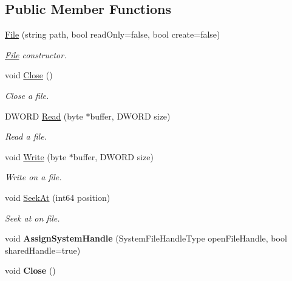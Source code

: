\subsection*{Public Member Functions}
\begin{DoxyCompactItemize}
\item 
\hyperlink{class_gost_crypt_1_1_file_abc79497e09b0c9600a229e1eb5edecad}{File} (string path, bool read\+Only=false, bool create=false)
\begin{DoxyCompactList}\small\item\em \hyperlink{class_gost_crypt_1_1_file}{File} constructor. \end{DoxyCompactList}\item 
void \hyperlink{class_gost_crypt_1_1_file_aec5740eb69e5ec15d77818aadeaf5001}{Close} ()
\begin{DoxyCompactList}\small\item\em Close a file. \end{DoxyCompactList}\item 
D\+W\+O\+RD \hyperlink{class_gost_crypt_1_1_file_a633fa1572500c241ddb5b9272bb70600}{Read} (byte $\ast$buffer, D\+W\+O\+RD size)
\begin{DoxyCompactList}\small\item\em Read a file. \end{DoxyCompactList}\item 
void \hyperlink{class_gost_crypt_1_1_file_a994d0e6bff285330edea0f5daaa17da1}{Write} (byte $\ast$buffer, D\+W\+O\+RD size)
\begin{DoxyCompactList}\small\item\em Write on a file. \end{DoxyCompactList}\item 
void \hyperlink{class_gost_crypt_1_1_file_abfbb1c586ef29c31a905d1478d323bdd}{Seek\+At} (int64 position)
\begin{DoxyCompactList}\small\item\em Seek at on file. \end{DoxyCompactList}\item 
\mbox{\label{class_gost_crypt_1_1_file_ad701bd2ec025e674f2032dc6b2391fe8}} 
void {\bfseries Assign\+System\+Handle} (System\+File\+Handle\+Type open\+File\+Handle, bool shared\+Handle=true)
\item 
\mbox{\label{class_gost_crypt_1_1_file_aec5740eb69e5ec15d77818aadeaf5001}} 
void {\bfseries Close} ()

\end{DoxyCompactItemize}
